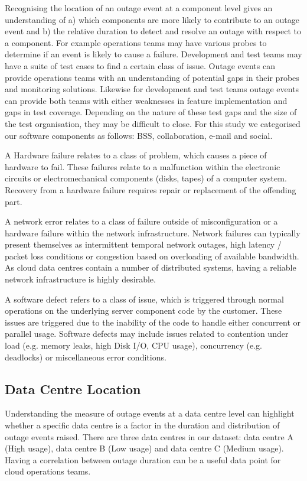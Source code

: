 \documentclass[conference]{IEEEtran}
\begin{document}
Recognising the location of an outage event at a component level gives an understanding of a) which components are more likely to contribute to an outage event and b) the relative duration to detect and resolve an outage with respect to a component. For example operations teams may have various probes to determine if an event is likely to cause a failure. Development and test teams may have a suite of test cases to find a certain class of issue. Outage events can provide operations teams with an understanding of potential gaps in their probes and monitoring solutions. Likewise for development and test teams outage events can provide both teams with either weaknesses in feature implementation and gaps in test coverage. Depending on the nature of these test gaps and the size of the test organisation, they may be difficult to close. For this study we categorised our software components as follows: BSS, collaboration, e-mail and social. \par
A Hardware failure relates to a class of problem, which causes a piece of hardware to fail. These failures relate to a malfunction within the electronic circuits or electromechanical components (disks, tapes) of a computer system. Recovery from a hardware failure requires repair or replacement of the offending part. \par
A network error relates to a class of failure outside of misconfiguration or a hardware failure within the network infrastructure. Network failures can typically present themselves as intermittent temporal network outages, high latency / packet loss conditions or congestion based on overloading of available bandwidth. As cloud data centres contain a number of distributed systems, having a reliable network infrastructure is highly desirable. \par
A software defect refers to a class of issue, which is triggered through normal operations on the underlying server component code by the customer. These issues are triggered due to the inability of the code to handle either concurrent or parallel usage. Software defects may include issues related to contention under load (e.g. memory leaks, high Disk I/O, CPU usage), concurrency (e.g. deadlocks) or miscellaneous error conditions. 

\subsection{Data Centre Location}

Understanding the measure of outage events at a data centre level can highlight whether a specific data centre is a factor in the duration and distribution of outage events raised. There are three data centres in our dataset: data centre A (High usage), data centre B (Low usage) and data centre C (Medium usage). Having a correlation between outage duration can be a useful data point for cloud operations teams.
\end{document}
